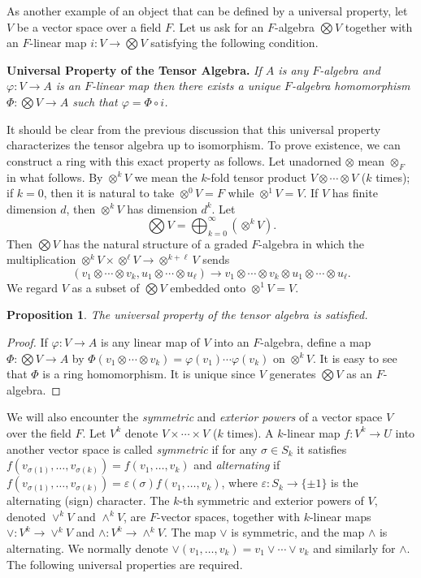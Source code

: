 \documentclass[12pt,reqno]{book}%
\newtheorem{proposition}{Proposition}[chapter]
\theoremstyle{definition}
\theoremstyle{remark}
\theoremstyle{theorem}
\theoremstyle{remark}
\begin{document}
As another example of an object that can be defined by a universal property, let $V$ be a vector space over a field $F$.
Let us ask for an $F$-algebra $\bigotimes V$ together with an $F$-linear map $i : V \to \bigotimes V$ satisfying the following condition.

\textbf{Universal Property of the Tensor Algebra.} \textit{If $A$ is any $F$-algebra and $\varphi : V \to A$ is an $F$-linear map then there exists a unique $F$-algebra homomorphism $\Phi : \bigotimes V \to A$ such that $\varphi = \Phi \circ i$.}

It should be clear from the previous discussion that this universal property characterizes the tensor algebra up to isomorphism.
To prove existence, we can construct a ring with this exact property as follows.
Let unadorned $\otimes$ mean $\otimes_F$ in what follows.
By $\otimes^k V$ we mean the $k$-fold tensor product $V \otimes \cdots \otimes V$ ($k$ times); if $k = 0$, then it is natural to take $\otimes^0 V = F$ while $\otimes^1 V = V$.
If $V$ has finite dimension $d$, then $\otimes^k V$ has dimension $d^k$.
Let
\[
    \bigotimes V = \bigoplus_{k = 0}^{\infty} (\otimes^k V).
\]
Then $\bigotimes V$ has the natural structure of a graded $F$-algebra in which the multiplication $\otimes^k V \times \otimes^\ell V \to \otimes^{k + \ell} V$ sends
\[
    (v_1 \otimes \cdots \otimes v_k, u_1 \otimes \cdots \otimes u_\ell) \to v_1 \otimes \cdots \otimes v_k \otimes u_1 \otimes \cdots \otimes u_\ell.
\]
We regard $V$ as a subset of $\bigotimes V$ embedded onto $\otimes^1 V = V$.

\begin{proposition}\label{prop9.1}%
    The universal property of the tensor algebra is satisfied.
\end{proposition}%
\begin{proof}%
    If $\varphi : V \to A$ is any linear map of $V$ into an $F$-algebra, define a map $\Phi : \bigotimes V \to A$ by $\Phi(v_1 \otimes \cdots \otimes v_k) = \varphi(v_1) \cdots \varphi(v_k)$ on $\otimes^kV$.
    It is easy to see that $\Phi$ is a ring homomorphism.
    It is unique since $V$ generates $\bigotimes V$ as an $F$-algebra.
\end{proof}%

We will also encounter the \emph{symmetric} and \emph{exterior powers} of a vector space $V$ over the field $F$.
Let $V^k$ denote $V \times \cdots \times V$ ($k$ times).
A $k$-linear map $f : V^k \to U$ into another vector space is called \emph{symmetric} if for any $\sigma \in S_k$ it satisfies $f(v_{\sigma(1)}, \ldots, v_{\sigma(k)}) = f(v_1, \ldots, v_k)$ and \emph{alternating} if $f(v_{\sigma(1)}, \ldots, v_{\sigma(k)}) = \varepsilon(\sigma) f(v_1, \ldots, v_k)$, where $\varepsilon : S_k \to \{\pm 1\}$ is the alternating (sign) character.
The $k$-th symmetric and exterior powers of $V$, denoted $\vee^k V$ and $\wedge^kV$, are $F$-vector spaces, together with $k$-linear maps $\vee : V^k \to \vee^kV$ and $\wedge : V^k \to \wedge^kV$.
The map $\vee$ is symmetric, and the map $\wedge$ is alternating.
We normally denote $\vee(v_1, \ldots, v_k) = v_1 \vee \cdots \vee v_k$ and similarly for $\wedge$.
The following universal properties are required.
\end{document}
